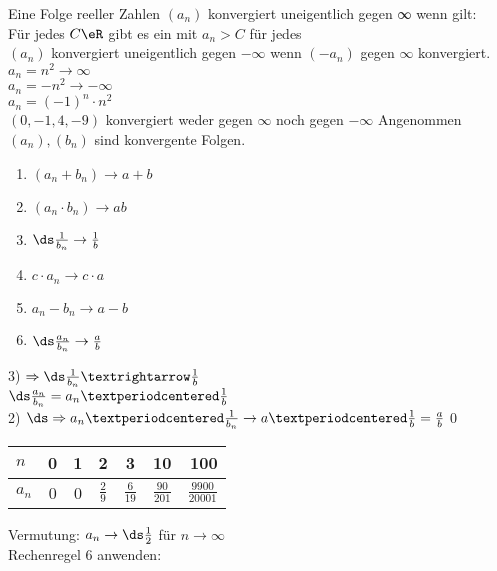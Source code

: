 %
\setcounter{chapter}{3}
\setcounter{section}{9}
%
\wdh
Eine Folge reeller Zahlen $(a_n)$ konvergiert uneigentlich gegen ∞ wenn gilt:\\
Für jedes $C\eR$ gibt es ein \nN{} mit $a_n > C$ für jedes \nN\\[4pt]
$(a_n)$ konvergiert uneigentlich gegen $- ∞$ wenn $(-a_n)$ gegen $∞$ konvergiert.\\
%
%
\bsp
$a_n = n^2 \to ∞$\\
$a_n = -n^2 \to -∞$\\
$a_n = (-1)^n · n^2$\\
$(0, -1, 4, -9)$ konvergiert weder gegen $∞$ noch gegen $ - ∞$
%
Angenommen $(a_n), (b_n)$ sind konvergente Folgen.\\
\begin{enumerate}
\item{$(a_n + b_n) \to a + b$}
\item{$(a_n · b_n) \to ab$}
\item{$\ds\frac{1}{b_n} \to \frac{1}{b}$}
\item{$c · a_n \to c · a$}
\item{$a_n - b_n \to a - b$}
\item{$\ds\frac{a_n}{b_n} \to \frac{a}{b}$}
\end{enumerate}
%
3) $\Rightarrow\ds\frac{1}{b_n}→\frac{1}{b}$\\
$\ds\frac{a_n}{b_n} = a_n ·\frac{1}{b}$\\
2) $\ds\Rightarrow a_n · \frac{1}{b_n} \to a ·\frac{1}{b} = \frac{a}{b}$\qed
%
\bsp
\begin{tabular}{l|c|c|c|c|c|r}
$n$   & 0 & 1 & 2 & 3 & 10 & 100\\\hline
$a_n$ & 0 & 0 & $\frac{2}{9}$ & $\frac{6}{19}$ & $\frac{90}{201}$ & $\frac{9900}{20001}$ \\
\end{tabular}
\vspace{5mm}
Vermutung: $a_n \to \ds\frac{1}{2}$ für $n \to ∞$\\
Rechenregel 6 anwenden:\\
